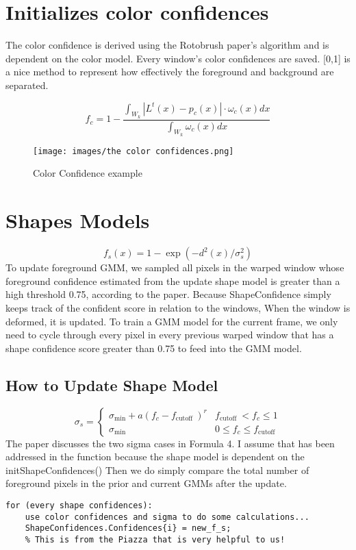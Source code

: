 \documentclass[15pt]{article}
\begin{document}
\section{Initializes color confidences}
The color confidence is derived using the Rotobrush paper's algorithm and is dependent on the color model. Every window's color confidences are saved. [0,1] is a nice method to represent how effectively the foreground and background are separated.


\begin{equation}
f_{c}=1-\frac{\int_{W_{k}}\left|L^{t}(x)-p_{c}(x)\right| \cdot \omega_{c}(x) d x}{\int_{W_{k}} \omega_{c}(x) d x}
\end{equation}
\begin{subfigure}{.5\textwidth}
  \texttt{[image: images/the color confidences.png]}
  \caption{Color Confidence example }
  \label{fig:sub1}
\end{subfigure}%
\section{Shapes Models}
\begin{equation}
f_{s}(x)=1-\exp \left(-d^{2}(x) / \sigma_{s}^{2}\right)
\end{equation}
To update foreground GMM, we sampled all pixels in the warped window whose foreground confidence estimated from the update shape model is greater than a high threshold 0.75, according to the paper. Because ShapeConfidence simply keeps track of the confident score in relation to the windows, When the window is deformed, it is updated. To train a GMM model for the current frame, we only need to cycle through every pixel in every previous warped window that has a shape confidence score greater than 0.75 to feed into the GMM model.

\subsection{How to Update Shape Model}
\begin{equation}
\sigma_{s}=\left\{\begin{array}{cl}
\sigma_{\min }+a\left(f_{c}-f_{\text {cutoff }}\right)^{r} & f_{\text {cutoff }}<f_{c} \leq 1 \\
\sigma_{\min } & 0 \leq f_{c} \leq f_{\text {cutoff }}
\end{array}\right.
\end{equation}
The paper discusses the two sigma cases in Formula 4. I assume that has been addressed in the function because the shape model is dependent on the initShapeConfidences() Then we do simply compare the total number of foreground pixels in the prior and current GMMs after the update.
\begin{lstlisting}
for (every shape confidences):
    use color confidences and sigma to do some calculations...
    ShapeConfidences.Confidences{i} = new_f_s;
    % This is from the Piazza that is very helpful to us!
\end{lstlisting}
\end{document}
